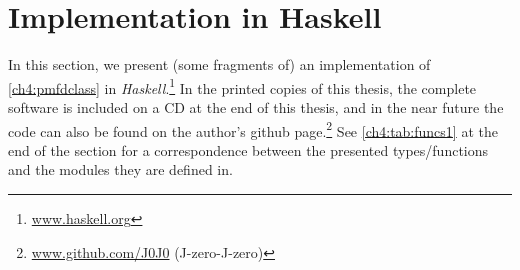 \newcommand{\framedhslinecorrect}[2]%
  {#1[#2]}

\newcommand{\framedhs}{\sethscode{framedhscode}}


\newenvironment{inlinehscode}%
  {\(\def\column##1##2{}%
   \let\>\undefined\let\<\undefined\let\\\undefined
   \newcommand\>[1][]{}\newcommand\<[1][]{}\newcommand\\[1][]{}%
   \def\fromto##1##2##3{##3}%
   \def\nextline{}}{\) }%

\newcommand{\inlinehs}{\sethscode{inlinehscode}}


\newenvironment{joincode}%
  {\let\orighscode=\hscode
   \let\origendhscode=\endhscode
   \def\endhscode{\def\hscode{\endgroup\def\@currenvir{hscode}\\}\begingroup}
   \orighscode\def\hscode{\endgroup\def\@currenvir{hscode}}}%
  {\origendhscode
   \global\let\hscode=\orighscode
   \global\let\endhscode=\origendhscode}%

\makeatother
\EndFmtInput
%

\section{Implementation in Haskell}
In this section, we present (some fragments of) an implementation of
\cref{ch4:pmfdclass} in
\emph{Haskell}.\footnote{\href{http://www.haskell.org/}{\url{www.haskell.org}}}
In the printed copies of this thesis, the complete software is included
on a CD at the end of this thesis, and in the near future the code can also be
found on the author's github
page.\footnote{\href{https://github.com/J0J0/}{\url{www.github.com/J0J0}}%
\;\;(J-zero-J-zero)}
See \cref{ch4:tab:funcs1} at the end of the section for a correspondence between
the presented types/functions and the modules they are defined in.

